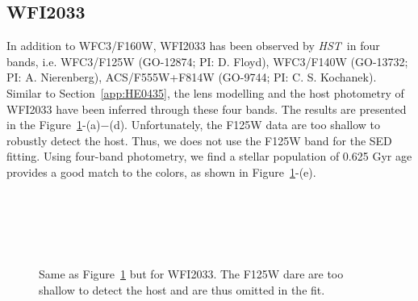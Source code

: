 \documentclass[fleqn,usenatbib]{mnras}
\newcommand{\hst}{{\it HST}}
\newcommand{\ding}[1]{\textcolor{red}{[{\bf Xuheng}: #1]}}
\begin{document}

\subsection{WFI2033}\label{app:WFI2033}
In addition to WFC3/F160W, WFI2033 has been observed by \hst\ in  four bands, i.e. WFC3/F125W (GO-12874; PI: D. Floyd), WFC3/F140W (GO-13732; PI: A. Nierenberg), ACS/F555W+F814W  (GO-9744; PI: C. S. Kochanek). Similar to Section~\ref{app:HE0435}, the lens modelling and the host photometry of WFI2033 have been inferred through these four bands. The results are presented in the Figure~\ref{fig:app_WFI2033}-(a)$-$(d). Unfortunately, the  F125W data are too shallow to robustly detect the host.  Thus, we does not use the F125W band for the SED fitting. Using four-band photometry, we find a stellar population of 0.625 Gyr age provides a good match to the colors, as shown in Figure~\ref{fig:app_WFI2033}-(e).
\begin{figure}
\centering
{}\\
\\
\\
\\
\caption{\label{fig:app_WFI2033} 
Same as Figure~\ref{fig:app_WFI2033} but for WFI2033. The F125W dare are too shallow to detect the host and are thus omitted in the fit.}
\end{figure} 


\bsp	%
\label{lastpage}
\end{document}
